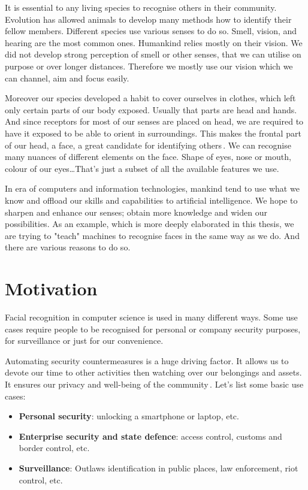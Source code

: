 It is essential to any living species to recognise others in their community. Evolution has allowed animals to develop many methods how to identify their fellow members. Different species use various senses to do so. Smell, vision, and hearing are the most common ones. Humankind relies mostly on their vision. We did not develop strong perception of smell or other senses, that we can utilise on purpose or over longer distances. Therefore we mostly use our vision which we can channel, aim and focus easily.

Moreover our species developed a habit to cover ourselves in clothes, which left only certain parts of our body exposed. Usually that parts are head and hands. And since receptors for most of our senses are placed on head, we are required to have it exposed to be able to orient in surroundings. This makes the frontal part of our head, a face, a great candidate for identifying others\,\cite{history}. We can recognise many nuances of different elements on the face. Shape of eyes, nose or mouth, colour of our eyes\dots That's just a subset of all the available features we use.

In era of computers and information technologies, mankind tend to use what we know and offload our skills and capabilities to artificial intelligence. We hope to sharpen and enhance our senses; obtain more knowledge and widen our possibilities. As an example, which is more deeply elaborated in this thesis, we are trying to "teach" machines to recognise faces in the same way as we do. And there are various reasons to do so.

\section{Motivation}
Facial recognition in computer science is used in many different ways. Some use cases require people to be recognised for personal or company security purposes, for surveillance or just for our convenience.

Automating security countermeasures is a huge driving factor. It allows us to devote our time to other activities then watching over our belongings and assets. It ensures our privacy and well-being of the community\,\cite{viola2004robust}. Let's list some basic use cases:

\begin{itemize}
    \item \textbf{Personal security}: unlocking a smartphone or laptop, etc.
    \item \textbf{Enterprise security and state defence}: access control, customs and border control, etc.
    \item \textbf{Surveillance}: Outlaws identification in public places, law enforcement, riot control, etc.
\end{itemize}

